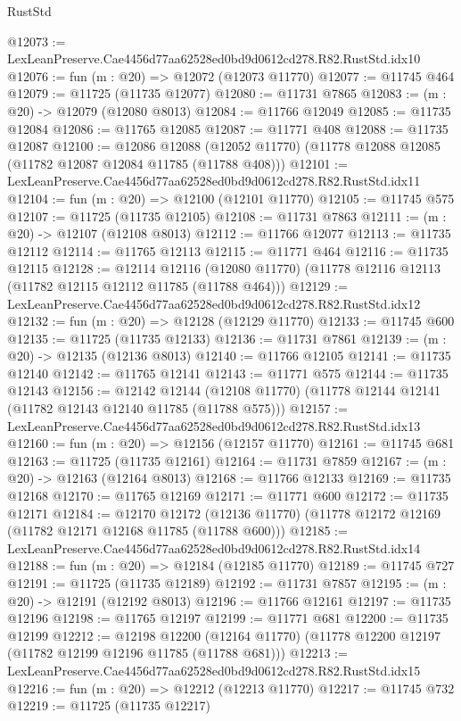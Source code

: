 \begin{lexlean}{RustStd}
\begin{coremodule}
@12073 := LexLeanPreserve.Cae4456d77aa62528ed0bd9d0612cd278.R82.RustStd.idx10
@12076 := fun (m : @20) => @12072 (@12073 @11770)
@12077 := @11745 @464
@12079 := @11725 (@11735 @12077)
@12080 := @11731 @7865
@12083 := (m : @20) -> @12079 (@12080 @8013)
@12084 := @11766 @12049
@12085 := @11735 @12084
@12086 := @11765 @12085
@12087 := @11771 @408
@12088 := @11735 @12087
@12100 := @12086
    @12088
    (@12052 @11770)
    (@11778 @12088 @12085 (@11782 @12087 @12084 @11785 (@11788 @408)))
@12101 := LexLeanPreserve.Cae4456d77aa62528ed0bd9d0612cd278.R82.RustStd.idx11
@12104 := fun (m : @20) => @12100 (@12101 @11770)
@12105 := @11745 @575
@12107 := @11725 (@11735 @12105)
@12108 := @11731 @7863
@12111 := (m : @20) -> @12107 (@12108 @8013)
@12112 := @11766 @12077
@12113 := @11735 @12112
@12114 := @11765 @12113
@12115 := @11771 @464
@12116 := @11735 @12115
@12128 := @12114
    @12116
    (@12080 @11770)
    (@11778 @12116 @12113 (@11782 @12115 @12112 @11785 (@11788 @464)))
@12129 := LexLeanPreserve.Cae4456d77aa62528ed0bd9d0612cd278.R82.RustStd.idx12
@12132 := fun (m : @20) => @12128 (@12129 @11770)
@12133 := @11745 @600
@12135 := @11725 (@11735 @12133)
@12136 := @11731 @7861
@12139 := (m : @20) -> @12135 (@12136 @8013)
@12140 := @11766 @12105
@12141 := @11735 @12140
@12142 := @11765 @12141
@12143 := @11771 @575
@12144 := @11735 @12143
@12156 := @12142
    @12144
    (@12108 @11770)
    (@11778 @12144 @12141 (@11782 @12143 @12140 @11785 (@11788 @575)))
@12157 := LexLeanPreserve.Cae4456d77aa62528ed0bd9d0612cd278.R82.RustStd.idx13
@12160 := fun (m : @20) => @12156 (@12157 @11770)
@12161 := @11745 @681
@12163 := @11725 (@11735 @12161)
@12164 := @11731 @7859
@12167 := (m : @20) -> @12163 (@12164 @8013)
@12168 := @11766 @12133
@12169 := @11735 @12168
@12170 := @11765 @12169
@12171 := @11771 @600
@12172 := @11735 @12171
@12184 := @12170
    @12172
    (@12136 @11770)
    (@11778 @12172 @12169 (@11782 @12171 @12168 @11785 (@11788 @600)))
@12185 := LexLeanPreserve.Cae4456d77aa62528ed0bd9d0612cd278.R82.RustStd.idx14
@12188 := fun (m : @20) => @12184 (@12185 @11770)
@12189 := @11745 @727
@12191 := @11725 (@11735 @12189)
@12192 := @11731 @7857
@12195 := (m : @20) -> @12191 (@12192 @8013)
@12196 := @11766 @12161
@12197 := @11735 @12196
@12198 := @11765 @12197
@12199 := @11771 @681
@12200 := @11735 @12199
@12212 := @12198
    @12200
    (@12164 @11770)
    (@11778 @12200 @12197 (@11782 @12199 @12196 @11785 (@11788 @681)))
@12213 := LexLeanPreserve.Cae4456d77aa62528ed0bd9d0612cd278.R82.RustStd.idx15
@12216 := fun (m : @20) => @12212 (@12213 @11770)
@12217 := @11745 @732
@12219 := @11725 (@11735 @12217)

\end{coremodule}
\end{lexlean}
